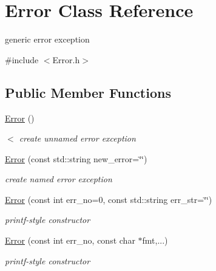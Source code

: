 \hypertarget{classError}{}\section{Error Class Reference}
\label{classError}


generic error exception  




{\ttfamily \#include $<$Error.\+h$>$}

\subsection*{Public Member Functions}
\begin{DoxyCompactItemize}
\item 
\hyperlink{classError_aca339d00ad8481fb4c184f0ece42698b}{Error} ()
\begin{DoxyCompactList}\small\item\em $<$ create unnamed error exception \end{DoxyCompactList}\item 
\mbox{\label{classError_a33c9f1966a27831eb49342ae02107fe5}} 
\hyperlink{classError_a33c9f1966a27831eb49342ae02107fe5}{Error} (const std\+::string new\+\_\+error=\char`\"{}\char`\"{})
\begin{DoxyCompactList}\small\item\em create named error exception \end{DoxyCompactList}\item 
\mbox{\label{classError_ae83a1b2e22001c74cb433c9db4b06c59}} 
\hyperlink{classError_ae83a1b2e22001c74cb433c9db4b06c59}{Error} (const int err\+\_\+no=0, const std\+::string err\+\_\+str=\char`\"{}\char`\"{})
\begin{DoxyCompactList}\small\item\em printf-\/style constructor \end{DoxyCompactList}\item 
\mbox{\label{classError_a3c4ebf23ad22025f4c3144318a4ccd3b}} 
\hyperlink{classError_a3c4ebf23ad22025f4c3144318a4ccd3b}{Error} (const int err\+\_\+no, const char $\ast$fmt,...)
\begin{DoxyCompactList}\small\item\em printf-\/style constructor \end{DoxyCompactList}\item 

\end{DoxyCompactItemize}
